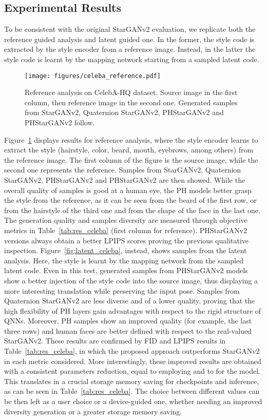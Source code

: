 \documentclass[conference]{IEEEtran}
\begin{document}
\subsection{Experimental Results}
To be consistent with the original StarGANv2 evaluation, we replicate both the reference guided analysis and latent guided one. In the former, the style code is extracted by the style encoder from a reference image. Instead, in the latter the style code is learnt by the mapping network starting from a sampled latent code.

\begin{figure}[t]
    \centering
    \texttt{[image: figures/celeba\_reference.pdf]}
    \caption{Reference analysis on CelebA-HQ dataset. Source image in the first column, then reference image in the second one. Generated samples from StarGANv2, Quaternion StarGANv2, PHStarGANv2  and PHStarGANv2  follow.}
    \label{fig:reference_celeba}
    \vspace{-0.02cm}
\end{figure}

Figure~\ref{fig:reference_celeba} displays results for reference analysis, where the style encoder learns to extract the style (hairstyle, color, beard, mouth, eyebrows, among others) from the reference image. The first column of the figure is the source image, while the second one represents the reference. Samples from StarGANv2, Quaternion StarGANv2, PHStarGANv2  and PHStarGANv2  are then showed. While the overall quality of samples is good at a human eye, the PH models better grasp the style from the reference, as it can be seen from the beard of the first row, or from the hairstyle of the third one and from the shape of the face in the last one. The generation quality and samples diversity are measured through objective metrics in Table~\ref{tab:res_celeba} (first column for reference). PHStarGANv2 versions always obtain a better LPIPS scores proving the previous qualitative inspection. Figure~\ref{fig:latent_celeba}, instead, shows samples from the latent analysis. Here, the style is learnt by the mapping network from the sampled latent code. Even in this test, generated samples from PHStarGANv2 models show a better injection of the style code into the source image, thus displaying a more interesting translation while preserving the input pose. Samples from Quaternion StarGANv2 are less diverse and of a lower quality, proving that the high flexibility of PH layers gain advantages with respect to the rigid structure of QNNs. Moreover, PH samples show an improved quality (for example, the last three rows) and human faces are better defined with respect to the real-valued StarGANv2. These results are confirmed by FID and LPIPS results in Table~\ref{tab:res_celeba}, in which the proposed approach outperforms StarGANv2 in each metric considered. More interestingly, these improved results are obtained with a consistent parameters reduction, equal to  employing  and to  for the  model. This translates in a crucial storage memory saving for checkpoints and inference, as can be seen in Table~\ref{tab:res_celeba}. The choice between different  values can be then left as a user choice or a device-guided one, whether needing an improved diversity generation or a greater storage memory saving.
\end{document}
